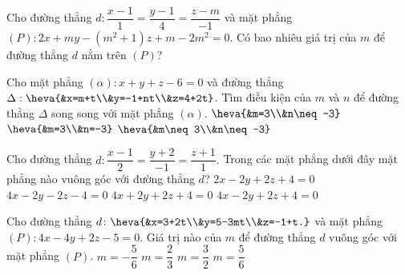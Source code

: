 \begin{ex}
	Cho đường thẳng $d:\dfrac{x-1}{1}=\dfrac{y-1}{4}=\dfrac{z-m}{-1}$ và mặt phẳng $(P): 2x+my-(m^2+1)z+m-2m^2=0$. Có bao nhiêu giá trị của $m$ để đường thẳng $d$ nằm trên $(P)$?
	\loigiai{
	}
\end{ex}

\begin{ex}
	Cho mặt phẳng $(\alpha): x+y+z-6=0$ và đường thẳng $\Delta:\heva{&x=m+t\\&y=-1+nt\\&z=4+2t}$. Tìm điều kiện của $m$ và $n$ để đường thẳng $\Delta$ song song với mặt phẳng $(\alpha)$.
	{$\heva{&m=3\\&n\neq -3}$}
	{$\heva{&m=3\\&n=-3}$}
	{$\heva{&m\neq 3\\&n\neq -3}$}
	\loigiai{
	}
\end{ex}
\begin{ex}
	Cho đường thẳng $d\colon \dfrac{x-1}{2}=\dfrac{y+2}{-1}=\dfrac{z+1}{1}.$ Trong các mặt phẳng dưới đây mặt phẳng nào vuông góc với đường thẳng $d$?
	\choice
	{$2x-2y+2z+4=0$}
	{$4x-2y-2z-4=0$}
	{$4x+2y+2z+4=0$}
	{\True $4x-2y+2z+4=0$}
\end{ex}

\begin{ex}
	Cho đường thẳng $d\colon\heva{&x=3+2t\\&y=5-3mt\\&z=-1+t.}$ và mặt phẳng $(P)\colon4x-4y+2z-5=0$. Giá trị nào của $m$ để đường thẳng $d$ vuông góc với mặt phẳng $(P)$.
	\choice
	{$m=-\dfrac{5}{6}$}
	{\True $m=\dfrac{2}{3}$}
	{$m=\dfrac{3}{2}$}
	{$m=\dfrac{5}{6}$}
\end{ex}

